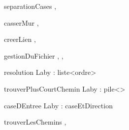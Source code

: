 \begin{algorithme}
    \signatureprocedure
        {separationCases}
        {, \\ 
         }
\end{algorithme}

\begin{algorithme}
    \signatureprocedure
        {casserMur}
        {, \\ 
         }
\end{algorithme}

\begin{algorithme}
    \signatureprocedure
        {creerLien}
        {, \\ 
         }
\end{algorithme}

\begin{algorithme}
    \signatureprocedure
        {gestionDuFichier}
        {, , }  \\ 
\end{algorithme}

\begin{algorithme}
    \signaturefonction
        {resolution}
        {Laby : {\Labyrinthe}}
        {liste<{ordre}>}
\end{algorithme}

\begin{algorithme}
    \signaturefonction
        {trouverPlusCourtChemin}
        {Laby : {\Labyrinthe}}
        {pile<{\naturelNonNul}>}
\end{algorithme}

\begin{algorithme}
    \signaturefonction
        {caseDEntree}
        {Laby : {\Labyrinthe}}
        {caseEtDirection}
\end{algorithme}

\begin{algorithme}
    \signatureprocedure
        {trouverLesChemins}
        {, \\ 
         }
\end{algorithme}		

